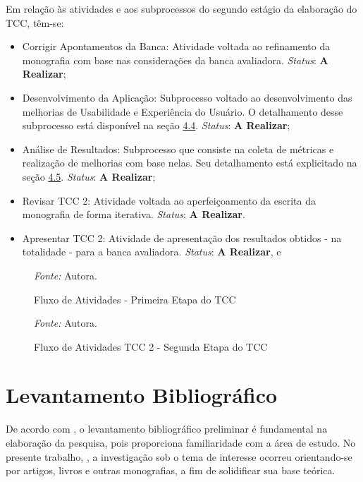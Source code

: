 Em relação às atividades e aos subprocessos do segundo estágio da elaboração do TCC, têm-se:

\begin{itemize}
	\item Corrigir Apontamentos da Banca: Atividade voltada ao refinamento da monografia com base nas considerações da banca avaliadora. \textit{Status}: \textbf{A Realizar};
	\item Desenvolvimento da Aplicação: Subprocesso voltado ao desenvolvimento das melhorias de Usabilidade e Experiência do Usuário. O detalhamento desse subprocesso está disponível na seção \hyperref[sec:Metodologia de Desenvolvimento]{4.4}. \textit{Status}: \textbf{A Realizar};
	\item Análise de Resultados: Subprocesso que consiste na coleta de métricas e realização de melhorias com base nelas. Seu detalhamento está explicitado na seção \hyperref[sec:Metodologia de Analise de Resultados]{4.5}. \textit{Status}: \textbf{A Realizar};
	\item Revisar TCC 2: Atividade voltada ao aperfeiçoamento da escrita da monografia de forma iterativa. \textit{Status}: \textbf{A Realizar}.
	\item Apresentar TCC 2: Atividade de apresentação dos resultados obtidos - na totalidade - para a banca avaliadora. \textit{Status}: \textbf{A Realizar}, e
\end{itemize}

\begin{figure}[h!]
	\centering
	\caption{Fluxo de Atividades - Primeira Etapa do TCC}
	\begin{tablenotes}[flushleft]
		\centering
		\item \textit{Fonte:} Autora.
	  \end{tablenotes}
	\label{fig04}
\end{figure}

\begin{figure}[h!]
	\centering
	\caption{Fluxo de Atividades TCC 2 - Segunda Etapa do TCC}
	\begin{tablenotes}[flushleft]
		\centering
		\item \textit{Fonte:} Autora.
	  \end{tablenotes}
	\label{fig05}
\end{figure}

\section{Levantamento Bibliográfico}
\label{sec:Levantamento Bibliografico}
De acordo com , o levantamento bibliográfico preliminar é fundamental na elaboração da pesquisa, pois proporciona familiaridade com a área de estudo. No presente trabalho, , a investigação sob o tema de interesse ocorreu orientando-se por artigos, livros e outras monografias, a fim de solidificar sua base teórica.

